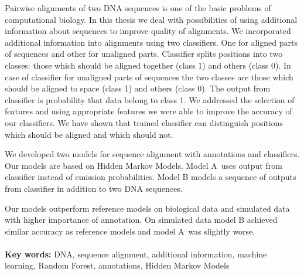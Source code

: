 Pairwise alignments of two DNA sequences is one of the basic problems of computational biology. In this thesis we deal with possibilities of using additional information about sequences to improve quality of alignments.
We incorporated additional information into alignments using two classifiers. One for aligned parts of sequences and other for unaligned parts.
Classifier splits positions into two classes: those which should be aligned together (class 1) and others (class 0). In case of classifier for unaligned parts of sequences the two classes are those which should be aligned to space (class 1) and others (class 0). The output from classifier is probability that data belong to class 1.
We addressed the selection of features and using appropriate features we were able to improve the accuracy of our classifiers.
We have shown that trained classifier can distinguish positions which should be aligned and which should not.

We developed two models for sequence alignment with annotations and classifiers. Our models are based on Hidden Markov Models.
Model A~uses output from classifier instead of emission probabilities.
Model B models a sequence of outputs from classifier in addition to two DNA sequences.

Our models outperform reference models on biological data and simulated data with higher importance of annotation.
On simulated data model B achieved similar accuracy as reference models and model A~was slightly worse.
\\ \\
{\bf Key words:} DNA, sequence alignment, additional information, machine learning, Random Forest, annotations, Hidden Markov Models
